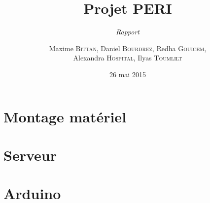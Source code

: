 \documentclass{scrreprt}
\begin{document}
\title{Projet PERI}
\subtitle{\textit{Rapport}}
\date{26 mai 2015}
\author{Maxime \textsc{Bittan}, Daniel \textsc{Bourdrez}, Redha \textsc{Gouicem},\\ Alexandra \textsc{Hospital}, Ilyas \textsc{Toumlilt}}


\maketitle

\pagebreak
\tableofcontents




\chapter{Montage matériel}


\chapter{Serveur}


\chapter{Arduino}

\end{document}

